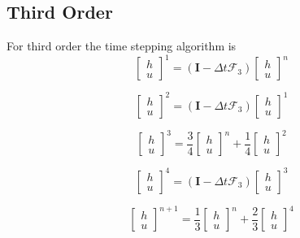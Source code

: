 \documentclass[12pt]{article}
\begin{document}
\subsection{Third Order}
For third order the time stepping algorithm is
\[\left[\begin{array}{c}
h \\ u
\end{array}\right]^{1} = (\boldsymbol{I} - \Delta t\boldsymbol{\mathcal{F}}_3 )\left[\begin{array}{c}
h \\ u
\end{array}\right]^n\]

\[\left[\begin{array}{c}
h \\ u
\end{array}\right]^{2} = (\boldsymbol{I} - \Delta t\boldsymbol{\mathcal{F}}_3 )\left[\begin{array}{c}
h \\ u
\end{array}\right]^1\]

\[\left[\begin{array}{c}
h \\ u
\end{array}\right]^{3} = \frac{3}{4}\left[\begin{array}{c}
h \\ u
\end{array}\right]^n +  \frac{1}{4}\left[\begin{array}{c}
h \\ u
\end{array}\right]^2\]

\[\left[\begin{array}{c}
h \\ u
\end{array}\right]^{4} = (\boldsymbol{I} - \Delta t\boldsymbol{\mathcal{F}}_3 )\left[\begin{array}{c}
h \\ u
\end{array}\right]^3\]

\[\left[\begin{array}{c}
h \\ u
\end{array}\right]^{n+1} = \frac{1}{3}\left[\begin{array}{c}
h \\ u
\end{array}\right]^n + \frac{2}{3}\left[\begin{array}{c}
h \\ u
\end{array}\right]^{4}\]
\end{document}
